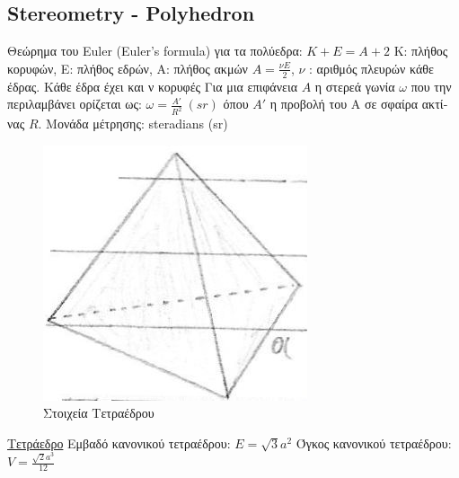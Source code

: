 \documentclass[12pt]{article}
\begin{document}
\begin{flushleft}
	
	\subsection{Stereometry - Polyhedron}

	\textbullet \quad \textgreek{Θεώρημα του} Euler (Euler's formula) \textgreek{για τα πολύεδρα}: $K + E = A + 2$ \linebreak
	K: \textgreek{πλήθος κορυφών}, E: \textgreek{πλήθος εδρών}, A: \textgreek{πλήθος ακμών} \linebreak
	\textbullet \quad $\displaystyle  A= \frac{\nu E}{2} $, $\nu$  :  \textgreek{αριθμός πλευρών κάθε έδρας. Κάθε έδρα έχει και ν κορυφές} \linebreak 
	\textbullet \quad \textgreek{Για μια επιφάνεια} $A$ \textgreek{η στερεά γωνία} $\omega$ \textgreek{που την περιλαμβάνει ορίζεται ως}: $\displaystyle  \omega = \frac{A'}{ R^2} \ (sr)$ \linebreak 
	\textgreek{όπου} $A'$ \textgreek{η προβολή του Α σε σφαίρα ακτίνας} $R$. \linebreak 
	\textgreek{Μονάδα μέτρησης}: steradians (sr) \linebreak 
	
	\begin{figure}[H]
	\centering
	\includegraphics[scale=2]{tetrahedron}
	\caption{\textgreek{Στοιχεία Τετραέδρου}}
	\label{fig:tetrahedron}
	\end{figure}
	
	\uline{\textgreek{Τετράεδρο}} \linebreak 
	\textbullet \quad \textgreek{Εμβαδό κανονικού τετραέδρου: } $\displaystyle E =\sqrt{3} a^2 $ \linebreak 
	\textbullet \quad \textgreek{Όγκος κανονικού τετραέδρου: } $\displaystyle V = \frac{\sqrt{2}a^3}{12} $ \linebreak 


\end{flushleft}
\end{document}
